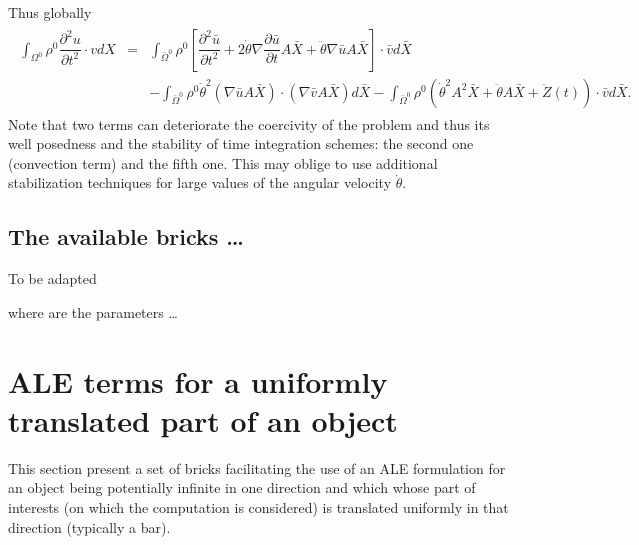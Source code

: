 \documentclass[a4paper,11pt,english]{sphinxmanual}
\begin{document}
Thus globally
\begin{equation*}
\begin{split}\begin{array}{rcl}
 \int_{\Omega^0} \rho^0 \dfrac{\partial^2 u}{\partial t^2}\cdot vdX &=&
 \int_{\bar{\Omega}^0} \rho^0 \left[\dfrac{\partial^2 \bar{u}}{\partial t^2} + 2\dot{\theta} \nabla\dfrac{\partial \bar{u}}{\partial t}A \bar{X} + \ddot{\theta} \nabla\bar{u} A \bar{X}   \right] \cdot \bar{v} d\bar{X}\\
&& - \int_{\bar{\Omega}^0} \rho^0 \dot{\theta}^2(\nabla\bar{u}A \bar{X}) \cdot (\nabla \bar{v} A \bar{X}) d\bar{X} - \int_{\bar{\Omega}^0} \rho^0 (\dot{\theta}^2 A^2 \bar{X} + \ddot{\theta} A\bar{X} + \ddot{Z}(t))\cdot \bar{v} d\bar{X}.
\end{array}\end{split}
\end{equation*}
Note that two terms can deteriorate the coercivity of the problem and thus its well posedness and the stability of time integration schemes: the second one (convection term) and the fifth one. This may oblige to use additional stabilization techniques for large values of the angular velocity \(\dot{\theta}\).


\subsection{The available bricks …}
\label{\detokenize{userdoc/model_ALE_rotating:the-available-bricks}}
To be adapted

\begin{sphinxVerbatim}[commandchars=\\\{\}]
  
\end{sphinxVerbatim}

where  are the parameters …


\section{ALE terms for a uniformly translated part of an object}
\label{\detokenize{userdoc/model_ALE_rotating:ale-terms-for-a-uniformly-translated-part-of-an-object}}
This section present a set of bricks facilitating the use of an ALE formulation for an object being potentially infinite in one direction and which whose part of interests (on which the computation is considered) is translated uniformly in that direction (typically a bar).
\end{document}

